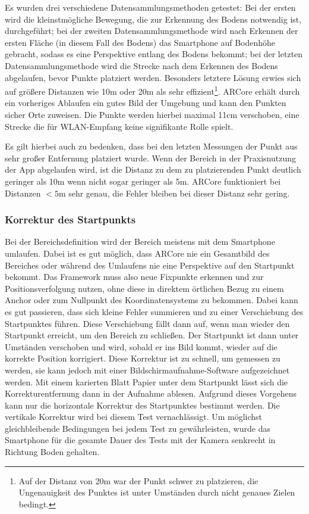 \documentclass[10pt]{scrartcl}
\begin{document}
Es wurden drei verschiedene Datensammlungsmethoden getestet: Bei der ersten wird die kleinstmögliche Bewegung, die zur Erkennung des Bodens notwendig ist, durchgeführt; bei der zweiten Datensammlungsmethode wird nach Erkennen der ersten Fläche (in diesem Fall des Bodens) das Smartphone auf Bodenhöhe gebracht, sodass es eine Perspektive entlang des Bodens bekommt; bei der letzten Datensammlungsmethode wird die Strecke nach dem Erkennen des Bodens abgelaufen, bevor Punkte platziert werden. Besonders letztere Lösung erwies sich auf größere Distanzen wie 10m oder 20m als sehr effizient\footnote{Auf der Distanz von 20m war der Punkt schwer zu platzieren, die Ungenauigkeit des Punktes ist unter Umständen durch nicht genaues Zielen bedingt.}. ARCore erhält durch ein vorheriges Ablaufen ein gutes Bild der Umgebung und kann den Punkten sicher Orte zuweisen. Die Punkte werden hierbei maximal 11cm verschoben, eine Strecke die für WLAN-Empfang keine signifikante Rolle spielt.

Es gilt hierbei auch zu bedenken, dass bei den letzten Messungen der Punkt aus sehr großer Entfernung platziert wurde. Wenn der Bereich in der Praxisnutzung der App abgelaufen wird, ist die Distanz zu dem zu platzierenden Punkt deutlich geringer als 10m wenn nicht sogar geringer als 5m. ARCore funktioniert bei Distanzen $<5$m sehr genau, die Fehler bleiben bei dieser Distanz sehr gering.

\subsubsection{Korrektur des Startpunkts}
Bei der Bereichsdefinition wird der Bereich meistens mit dem Smartphone umlaufen. Dabei ist es gut möglich, dass ARCore nie ein Gesamtbild des Bereiches oder während des Umlaufens nie eine Perspektive auf den Startpunkt bekommt. Das Framework muss also neue Fixpunkte erkennen und zur Positionsverfolgung nutzen, ohne diese in direktem örtlichen Bezug zu einem Anchor oder zum Nullpunkt des Koordinatensystems zu bekommen. Dabei kann es gut passieren, dass sich kleine Fehler summieren und zu einer Verschiebung des Startpunktes führen. Diese Verschiebung fällt dann auf, wenn man wieder den Startpunkt erreicht, um den Bereich zu schließen. Der Startpunkt ist dann unter Umständen verschoben und wird, sobald er ins Bild kommt, wieder auf die korrekte Position korrigiert. Diese Korrektur ist zu schnell, um gemessen zu werden, sie kann jedoch mit einer Bildschirmaufnahme-Software aufgezeichnet werden. Mit einem karierten Blatt Papier unter dem Startpunkt lässt sich die Korrekturentfernung dann in der Aufnahme ablesen. Aufgrund dieses Vorgehens kann nur die horizontale Korrektur des Startpunktes bestimmt werden. Die vertikale Korrektur wird bei diesem Test vernachlässigt. Um möglichst gleichbleibende Bedingungen bei jedem Test zu gewährleisten, wurde das Smartphone für die gesamte Dauer des Tests mit der Kamera senkrecht in Richtung Boden gehalten.
\end{document}
